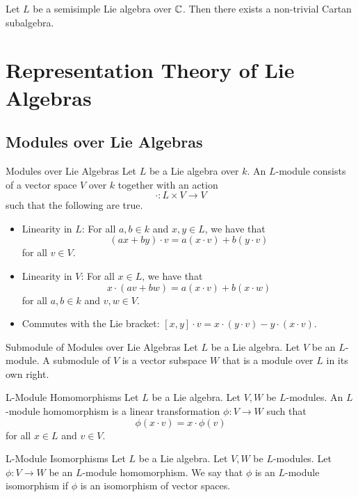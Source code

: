\documentclass[a4paper]{article}
\begin{document}
\begin{lmm}{}{} Let $L$ be a semisimple Lie algebra over $\mathbb{C}$. Then there exists a non-trivial Cartan subalgebra. 
\end{lmm}

\pagebreak
\section{Representation Theory of Lie Algebras}
\subsection{Modules over Lie Algebras}
\begin{defn}{Modules over Lie Algebras}{} Let $L$ be a Lie algebra over $k$. An $L$-module consists of a vector space $V$ over $k$ together with an action $$\cdot:L\times V\to V$$ such that the following are true. 
\begin{itemize}
\item Linearity in $L$: For all $a,b\in k$ and $x,y\in L$, we have that $$(ax+by)\cdot v=a(x\cdot v)+b(y\cdot v)$$ for all $v\in V$. 
\item Linearity in $V$: For all $x\in L$, we have that $$x\cdot(av+bw)=a(x\cdot v)+b(x\cdot w)$$ for all $a,b\in k$ and $v,w\in V$. 
\item Commutes with the Lie bracket: $[x,y]\cdot v=x\cdot(y\cdot v)-y\cdot(x\cdot v)$. 
\end{itemize}
\end{defn}

\begin{defn}{Submodule of Modules over Lie Algebras}{} Let $L$ be a Lie algebra. Let $V$ be an $L$-module. A submodule of $V$ is a vector subspace $W$ that is a module over $L$ in its own right. 
\end{defn}

\begin{defn}{L-Module Homomorphisms}{} Let $L$ be a Lie algebra. Let $V,W$ be $L$-modules. An $L$-module homomorphism is a linear transformation $\phi:V\to W$ such that $$\phi(x\cdot v)=x\cdot\phi(v)$$ for all $x\in L$ and $v\in V$. 
\end{defn}

\begin{defn}{L-Module Isomorphisms}{} Let $L$ be a Lie algebra. Let $V,W$ be $L$-modules. Let $\phi:V\to W$ be an $L$-module homomorphism. We say that $\phi$ is an $L$-module isomorphism if $\phi$ is an isomorphism of vector spaces. 
\end{defn}
\end{document}
